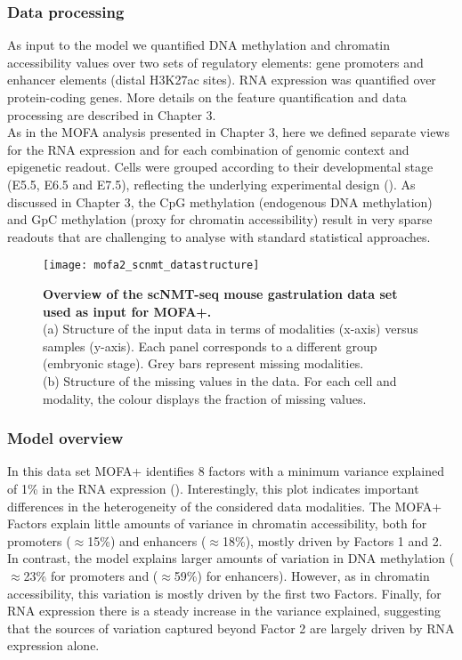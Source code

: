 \subsubsection{Data processing}

As input to the model we quantified DNA methylation and chromatin accessibility values over two sets of regulatory elements: gene promoters and enhancer elements (distal H3K27ac sites). RNA expression was quantified over protein-coding genes. More details on the feature quantification and data processing are described in Chapter 3.\\

As in the MOFA analysis presented in Chapter 3, here we defined separate views for the RNA expression and for each combination of genomic context and epigenetic readout. Cells were grouped according to their developmental stage (E5.5, E6.5 and E7.5), reflecting the underlying experimental design\cite{Argelaguet2019} (). As discussed in Chapter 3, the CpG methylation (endogenous DNA methylation) and GpC methylation (proxy for chromatin accessibility) result in very sparse readouts that are challenging to analyse with standard statistical approaches.

\begin{figure}[H]
	\centering
	\texttt{[image: mofa2\_scnmt\_datastructure]}
	\caption[]{
	\textbf{Overview of the scNMT-seq mouse gastrulation data set used as input for MOFA+.}\\
	(a) Structure of the input data in terms of modalities (x-axis) versus samples (y-axis). Each panel corresponds to a different group (embryonic stage). Grey bars represent missing modalities. \\
	(b) Structure of the missing values in the data. For each cell and modality, the colour displays the fraction of missing values.
	}
	\label{fig:mofa2_scnmt_datastructure}
\end{figure}

\subsubsection{Model overview}

In this data set MOFA+ identifies 8 factors with a minimum variance explained of 1\% in the RNA expression (). Interestingly, this plot indicates important differences in the heterogeneity of the considered data modalities. The MOFA+ Factors explain little amounts of variance in chromatin accessibility, both for promoters ($\approx$15\%) and enhancers ($\approx$18\%), mostly driven by Factors 1 and 2. In contrast, the model explains larger amounts of variation in DNA methylation ($\approx$23\% for promoters and ($\approx$59\%) for enhancers). However, as in chromatin accessibility, this variation is mostly driven by the first two Factors. Finally, for RNA expression there is a steady increase in the variance explained, suggesting that the sources of variation captured beyond Factor 2 are largely driven by RNA expression alone.

